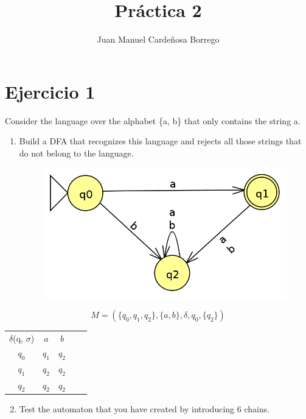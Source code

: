 \documentclass[11pt]{article}
\title{\textbf{Práctica 2}}
\author{Juan Manuel Cardeñosa Borrego}
\date{}
\begin{document}
\maketitle
\thispagestyle{empty}

\section*{Ejercicio 1}
Consider the language over the alphabet \{a, b\} that only contains the string a.
\begin{enumerate}
\item Build a DFA that recognizes this language and rejects all those strings that
do not belong to the language.
\begin{figure}[htp]
\centering
\includegraphics[scale=0.30]{images/automata.png}
\label{}
\end{figure}
\end{enumerate}

\begin{equation}
	M = (\{q_0, q_1, q_2\}, \{a, b\}, \delta, q_0, \{q_2\})
\end{equation}

\begin{table}[]
\centering
\begin{tabular}{c|c|ccc}
$\delta$(q, $\sigma$) & $a$    & $b$    &  &  \\ \cline{1-3}
$q_0$   & $q_1$ & $q_2$&  &  \\ \cline{1-3}
$q_1$   & $q_2$ & $q_2$ &  &  \\ \cline{1-3}
$q_2$    & $q_2$ & $q_2$ &  & 
\end{tabular}
\end{table}

\newpage

\begin{enumerate}
\setcounter{enumi}{1}
\item Test the automaton that you have created by introducing 6 chains.
\end{enumerate}
\end{document}
